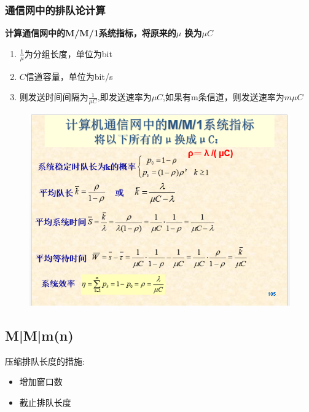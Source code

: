 \subsubsection{通信网中的排队论计算}
\textbf{计算通信网中的M/M/1系统指标，将原来的$\mu$ 换为$\mu C$}
\begin{enumerate}
	\item $ \frac{1}{\mu} $为分组长度，单位为bit
	\item $ C $信道容量，单位为bit/s
	\item 则发送时间间隔为$ \frac{1}{\mu C} $,即发送速率为$ \mu C $,如果有m条信道，则发送速率为$ m\mu C $
\end{enumerate}
\begin{figure}[H]
	\centering
	\includegraphics[width=0.7\linewidth]{figures/screenshot026}
	\caption{}
	\label{fig:screenshot026}
\end{figure}
\subsection{M|M|m(n)}
压缩排队长度的措施:
\begin{itemize}
	\item 增加窗口数
	\item 截止排队长度
\end{itemize}

